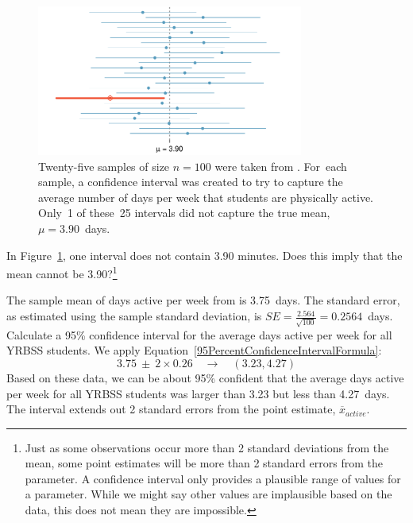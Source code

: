 \begin{spacing}{1.5}
\begin{figure}[hht]
   \centering
   \includegraphics[width=0.78\textwidth]
{ch_inference_foundations_oi_biostat/figures/95PercentConfidenceInterval/95PercentConfidenceInterval}
   \caption{Twenty-five samples of size $n=100$ were taken from . For~each sample, a confidence interval was created to try to capture the average number of days per week that students are physically active. Only~1 of these~25 intervals did not capture the true mean, $\mu = 3.90$~days.}
   \label{95PercentConfidenceInterval}
\end{figure}

\begin{exercise}
In Figure~\ref{95PercentConfidenceInterval}, one interval does not contain 3.90 minutes. Does this imply that the mean cannot be 3.90?\footnote{Just as some observations occur more than 2 standard deviations from the mean, some point estimates will be more than 2 standard errors from the parameter. A confidence interval only provides a plausible range of values for a parameter. While we might say other values are implausible based on the data, this does not mean they are impossible.}
\end{exercise}

\begin{example}{The sample mean of days active per week from  is 3.75~days. The standard error, as estimated using the sample standard deviation, is $SE=\frac{2.564}{\sqrt{100}} = 0.2564$~days. Calculate a 95\% confidence interval for the average days active per week for all YRBSS students.}
We apply Equation~\ref{95PercentConfidenceIntervalFormula}:
\[3.75\ \pm\ 2 \times  0.26 \quad \rightarrow \quad (3.23, 4.27)\]
Based on these data, we can be about 95\% confident that the average days active per week for all YRBSS students was larger than 3.23 but less than 4.27~days. The interval extends out 2 standard errors from the point estimate, $\overline{x}_{active}$.
\end{example}


\end{spacing}
